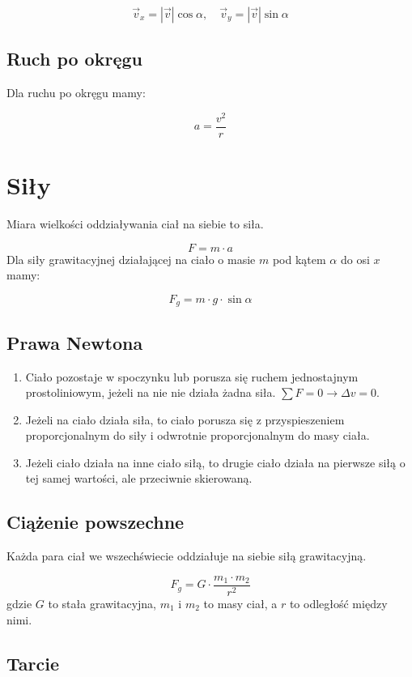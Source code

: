 \documentclass{../notatki}
\begin{document}
$$
\vec{v}_x = |\vec{v}| \cos \alpha, \quad \vec{v}_y = |\vec{v}| \sin \alpha
$$

\subsection{Ruch po okręgu}

Dla ruchu po okręgu mamy:

$$
a = \frac{v^2}{r}
$$

\section{Siły}

Miara wielkości oddziaływania ciał na siebie to siła.

$$
F = m \cdot a
$$
Dla siły grawitacyjnej działającej na ciało o masie $m$ pod kątem
$\alpha$ do osi $x$ mamy:

$$
F_g = m \cdot g \cdot \sin \alpha
$$

\subsection{Prawa Newtona}

\begin{enumerate}
  \item Ciało pozostaje w spoczynku lub porusza się ruchem jednostajnym
    prostoliniowym, jeżeli na nie nie działa żadna siła. $\sum F = 0
    \rightarrow \Delta v = 0$.
  \item Jeżeli na ciało działa siła, to ciało porusza się z przyspieszeniem
    proporcjonalnym do siły i odwrotnie proporcjonalnym do masy ciała.
  \item Jeżeli ciało działa na inne ciało siłą, to drugie ciało działa na
    pierwsze siłą o tej samej wartości, ale przeciwnie skierowaną.
\end{enumerate}

\subsection{Ciążenie powszechne}

Każda para ciał we wszechświecie oddziałuje na siebie siłą grawitacyjną.

$$
F_g = G \cdot \frac{m_1 \cdot m_2}{r^2}
$$
gdzie $G$ to stała grawitacyjna, $m_1$ i $m_2$ to masy ciał, a $r$ to odległość
między nimi.

\subsection{Tarcie}
\end{document}
